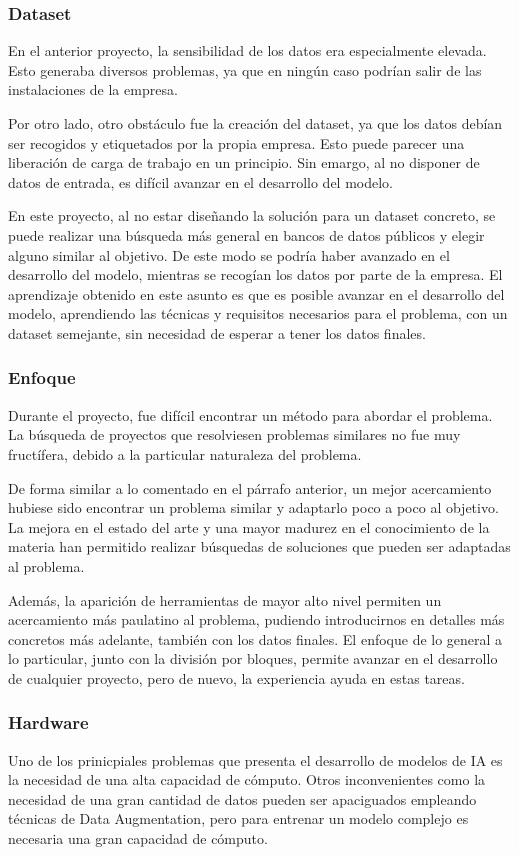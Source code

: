 \subsubsection{Dataset}
En el anterior proyecto, la sensibilidad de los datos era especialmente elevada.
Esto generaba diversos problemas, ya que en ningún caso podrían salir de las instalaciones de la empresa.

Por otro lado, otro obstáculo fue la creación del dataset, ya que los datos debían ser recogidos y etiquetados por la propia empresa.
Esto puede parecer una liberación de carga de trabajo en un principio. 
Sin emargo, al no disponer de datos de entrada, es difícil avanzar en el desarrollo del modelo.

En este proyecto, al no estar diseñando la solución para un dataset concreto, se puede realizar una búsqueda más general en bancos de datos públicos y elegir alguno similar al objetivo.
De este modo se podría haber avanzado en el desarrollo del modelo, mientras se recogían los datos por parte de la empresa.
El aprendizaje obtenido en este asunto es que es posible avanzar en el desarrollo del modelo, aprendiendo las técnicas y requisitos necesarios para el problema, con un dataset semejante, sin necesidad de esperar a tener los datos finales.

\subsubsection{Enfoque}
Durante el proyecto, fue difícil encontrar un método para abordar el problema.
La búsqueda de proyectos que resolviesen problemas similares no fue muy fructífera, debido a la particular naturaleza del problema.

De forma similar a lo comentado en el párrafo anterior, un mejor acercamiento hubiese sido encontrar un problema similar y adaptarlo poco a poco al objetivo.
La mejora en el estado del arte y una mayor madurez en el conocimiento de la materia han permitido realizar búsquedas de soluciones que pueden ser adaptadas al problema.

Además, la aparición de herramientas de mayor alto nivel permiten un acercamiento más paulatino al problema, pudiendo introducirnos en detalles más concretos más adelante, también con los datos finales.
El enfoque de lo general a lo particular, junto con la división por bloques, permite avanzar en el desarrollo de cualquier proyecto, pero de nuevo, la experiencia ayuda en estas tareas.

\subsubsection{Hardware}
Uno de los prinicpiales problemas que presenta el desarrollo de modelos de IA es la necesidad de una alta capacidad de cómputo.
Otros inconvenientes como la necesidad de una gran cantidad de datos pueden ser apaciguados empleando técnicas de Data Augmentation, pero para entrenar un modelo complejo es necesaria una gran capacidad de cómputo.

